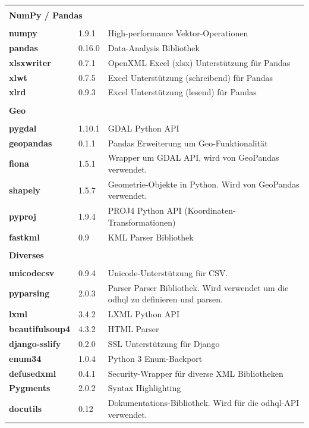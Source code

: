 \begin{tabularx}{\textwidth}{llX}
  \midrule\\
  \multicolumn{3}{l}{\textbf{NumPy / Pandas}}\\
  \midrule\\

  \textbf{numpy} & 1.9.1 & High-performance Vektor-Operationen\\
  \textbf{pandas} & 0.16.0 & Data-Analysis Bibliothek\\
  \textbf{xlsxwriter} & 0.7.1 & OpenXML Excel (xlsx) Unterstützung für Pandas\\
  \textbf{xlwt} & 0.7.5 & Excel Unterstützung (schreibend) für Pandas\\
  \textbf{xlrd} & 0.9.3 & Excel Unterstützung (lesend) für Pandas\\

  \midrule\\
  \multicolumn{3}{l}{\textbf{Geo}}\\
  \midrule\\

  \textbf{pygdal} & 1.10.1 & GDAL Python API\\
  \textbf{geopandas} & 0.1.1 & Pandas Erweiterung um Geo-Funktionalität\\
  \textbf{fiona} & 1.5.1 & Wrapper um GDAL API, wird von GeoPandas verwendet.\\
  \textbf{shapely} & 1.5.7 & Geometrie-Objekte in Python. Wird von GeoPandas verwendet.\\
  \textbf{pyproj} & 1.9.4 & PROJ4 Python API (Koordinaten-Transformationen)\\
  \textbf{fastkml} & 0.9 & KML Parser Bibliothek\\

  \midrule\\
  \multicolumn{3}{l}{\textbf{Diverses}}\\
  \midrule\\

  \textbf{unicodecsv} & 0.9.4 & Unicode-Unterstützung für CSV.\\
  \textbf{pyparsing} & 2.0.3 & Parser Parser Bibliothek. Wird verwendet um die \acf{odhql} zu definieren und parsen.\\
  \textbf{lxml} & 3.4.2 & LXML Python API\\
  \textbf{beautifulsoup4} & 4.3.2 & HTML Parser\\
  \textbf{django-sslify} & 0.2.0 & SSL Unterstützung für Django\\
  \textbf{enum34} & 1.0.4 & Python 3 Enum-Backport\\
  \textbf{defusedxml} & 0.4.1 & Security-Wrapper für diverse XML Bibliotheken\\
  \textbf{Pygments} & 2.0.2 & Syntax Highlighting\\
  \textbf{docutils} & 0.12 & Dokumentations-Bibliothek. Wird für die \acs{odhql}-API verwendet.\\


\end{tabularx}
